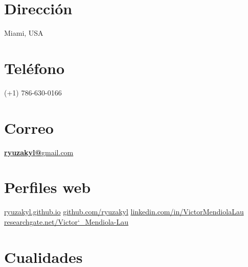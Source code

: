 \documentclass[]{friggeri-cv}
\begin{document}
      

\begin{aside}
  \section{Dirección}
    Miami, USA
    ~
    ~
    ~
  \section{Teléfono}
    (+1) 786-630-0166
    ~
    ~
    ~
  \section{Correo}
    \href{mailto:ryuzakyl@gmail.com}{\textbf{ryuzakyl@}gmail.com}
	~
	~    
    ~
  \section{Perfiles web}
    \href{https://ryuzakyl.github.io}{{\scriptsize ryuzakyl.github.io}}
    \href{https://github.com/ryuzakyl}{{\scriptsize github.com/ryuzakyl}}
    \href{https://www.linkedin.com/in/victormendiolalau}{{\scriptsize linkedin.com/in/VictorMendiolaLau}}
	\href{https://www.researchgate.net/profile/Victor_Mendiola-Lau}{{\scriptsize researchgate.net/Victor\char`_Mendiola-Lau}}
    ~
    ~
    ~
  \section{Cualidades}
    ~
\end{aside}
\end{document}

